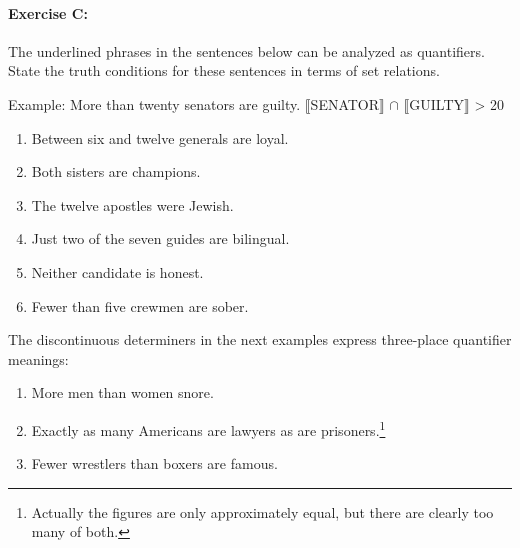 {\paragraph*{Exercise C:} The underlined phrases in the sentences below can be analyzed as quantifiers. State the truth conditions for these sentences in terms of set relations.

\ea
\textsf{Example:} \textsf{More than twenty}\textsf{ senators are guilty.   {\textbar}} $\llbracket$\textsf{SENATOR}$\rrbracket$ \textsf{ ${\cap}$} $\llbracket$\textsf{GUILTY}$\rrbracket$ \textsf{ {\textbar} > 20}
\z

\begin{enumerate}
\item Between six and twelve generals are loyal.
\item Both sisters are champions.
\item The twelve apostles were Jewish.
\item Just two of the seven guides are bilingual.
\item Neither candidate is honest.
\item Fewer than five crewmen are sober.
\end{enumerate}

The discontinuous determiners in the next examples express three-place quantifier meanings:

\begin{enumerate}
\item More men than women snore.
\item Exactly as many Americans are lawyers as are prisoners.\footnote{Actually the figures are only approximately equal, but there are clearly too many of both.}
\item Fewer wrestlers than boxers are famous.
\end{enumerate}
}

